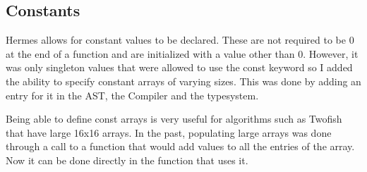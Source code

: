 
\subsection{Constants}
Hermes allows for constant values to be declared. These are not required to be 0 at the end of a function and are initialized with a value other than 0. However, it was only singleton values that were allowed to use the const keyword so I added the ability to specify constant arrays of varying sizes. This was done by adding an entry for it in the AST, the Compiler and the typesystem.

Being able to define const arrays is very useful for algorithms such as Twofish that have large 16x16 arrays. In the past, populating large arrays was done through a call to a function that would add values to all the entries of the array. Now it can be done directly in the function that uses it.
